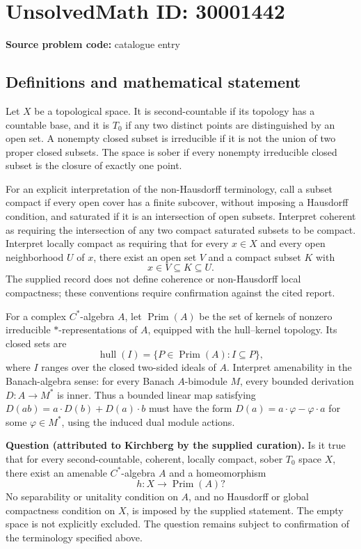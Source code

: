 \documentclass[11pt]{article}
\begin{document}
\section*{UnsolvedMath ID: 30001442}
\textbf{Source problem code:} catalogue entry
\subsection{Definitions and mathematical statement}
Let \(X\) be a topological space. It is second-countable if its topology has a countable base, and it is \(T_0\) if any two distinct points are distinguished by an open set. A nonempty closed subset is irreducible if it is not the union of two proper closed subsets. The space is sober if every nonempty irreducible closed subset is the closure of exactly one point.

For an explicit interpretation of the non-Hausdorff terminology, call a subset compact if every open cover has a finite subcover, without imposing a Hausdorff condition, and saturated if it is an intersection of open subsets. Interpret coherent as requiring the intersection of any two compact saturated subsets to be compact. Interpret locally compact as requiring that for every \(x\in X\) and every open neighborhood \(U\) of \(x\), there exist an open set \(V\) and a compact subset \(K\) with
\[
x\in V\subseteq K\subseteq U.
\]
The supplied record does not define coherence or non-Hausdorff local compactness; these conventions require confirmation against the cited report.

For a complex \(C^*\)-algebra \(A\), let \(\operatorname{Prim}(A)\) be the set of kernels of nonzero irreducible \(*\)-representations of \(A\), equipped with the hull--kernel topology. Its closed sets are
\[
\operatorname{hull}(I)=\{P\in\operatorname{Prim}(A):I\subseteq P\},
\]
where \(I\) ranges over the closed two-sided ideals of \(A\). Interpret amenability in the Banach-algebra sense: for every Banach \(A\)-bimodule \(M\), every bounded derivation \(D:A\to M^*\) is inner. Thus a bounded linear map satisfying \(D(ab)=a\cdot D(b)+D(a)\cdot b\) must have the form \(D(a)=a\cdot\varphi-\varphi\cdot a\) for some \(\varphi\in M^*\), using the induced dual module actions.

\textbf{Question (attributed to Kirchberg by the supplied curation).} Is it true that for every second-countable, coherent, locally compact, sober \(T_0\) space \(X\), there exist an amenable \(C^*\)-algebra \(A\) and a homeomorphism
\[
h:X\longrightarrow\operatorname{Prim}(A)?
\]
No separability or unitality condition on \(A\), and no Hausdorff or global compactness condition on \(X\), is imposed by the supplied statement. The empty space is not explicitly excluded. The question remains subject to confirmation of the terminology specified above.
\end{document}
